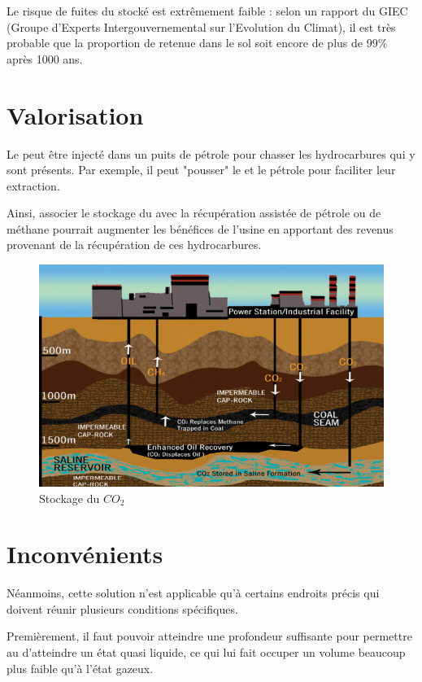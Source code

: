 \documentclass[10pt, a4, oneside, headings=normal]{scrartcl}
\begin{document}
Le risque de fuites du  stocké est extrêmement faible : selon un rapport du GIEC (Groupe d'Experts Intergouvernemental sur l'Evolution du Climat), il est très probable que la proportion de  retenue dans le sol soit encore de plus de 99\% après 1000 ans.

\section{Valorisation}
Le  peut être injecté dans un puits de pétrole pour chasser les hydrocarbures qui y sont présents. Par exemple, il peut "pousser" le  et le pétrole pour faciliter leur extraction.

Ainsi, associer le stockage du  avec la récupération assistée de pétrole ou de méthane pourrait augmenter les bénéfices de l'usine en apportant des revenus provenant de la récupération de ces hydrocarbures.

\begin{figure}[h!]
\caption{Stockage du $CO_2$ \protect \footnotemark}
\includegraphics[width=\textwidth]{captureee.png}
\end{figure}


\section{Inconvénients}

Néanmoins, cette solution n'est applicable qu'à certains endroits précis qui doivent réunir plusieurs conditions spécifiques. 

Premièrement, il faut pouvoir atteindre une profondeur suffisante pour permettre au  d'atteindre un état quasi liquide, ce qui lui fait occuper un volume beaucoup plus faible qu'à l'état gazeux.
\end{document}
